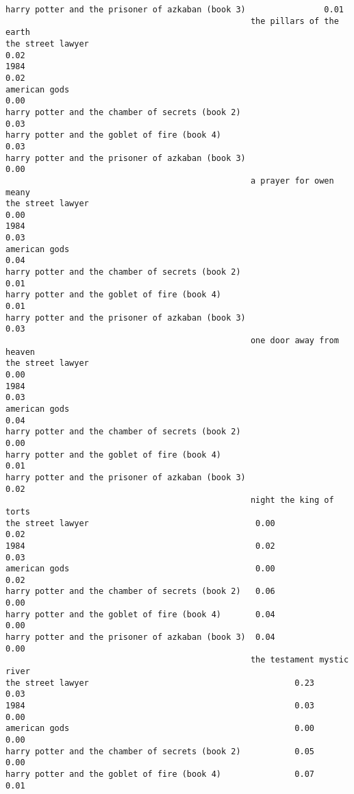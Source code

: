 \documentclass[
]{report}
\begin{document}
\begin{verbatim}
harry potter and the prisoner of azkaban (book 3)                0.01
                                                  the pillars of the earth
the street lawyer                                                     0.02
1984                                                                  0.02
american gods                                                         0.00
harry potter and the chamber of secrets (book 2)                      0.03
harry potter and the goblet of fire (book 4)                          0.03
harry potter and the prisoner of azkaban (book 3)                     0.00
                                                  a prayer for owen meany
the street lawyer                                                    0.00
1984                                                                 0.03
american gods                                                        0.04
harry potter and the chamber of secrets (book 2)                     0.01
harry potter and the goblet of fire (book 4)                         0.01
harry potter and the prisoner of azkaban (book 3)                    0.03
                                                  one door away from heaven
the street lawyer                                                      0.00
1984                                                                   0.03
american gods                                                          0.04
harry potter and the chamber of secrets (book 2)                       0.00
harry potter and the goblet of fire (book 4)                           0.01
harry potter and the prisoner of azkaban (book 3)                      0.02
                                                  night the king of torts
the street lawyer                                  0.00              0.02
1984                                               0.02              0.03
american gods                                      0.00              0.02
harry potter and the chamber of secrets (book 2)   0.06              0.00
harry potter and the goblet of fire (book 4)       0.04              0.00
harry potter and the prisoner of azkaban (book 3)  0.04              0.00
                                                  the testament mystic river
the street lawyer                                          0.23         0.03
1984                                                       0.03         0.00
american gods                                              0.00         0.00
harry potter and the chamber of secrets (book 2)           0.05         0.00
harry potter and the goblet of fire (book 4)               0.07         0.01

\end{verbatim}
\end{document}
